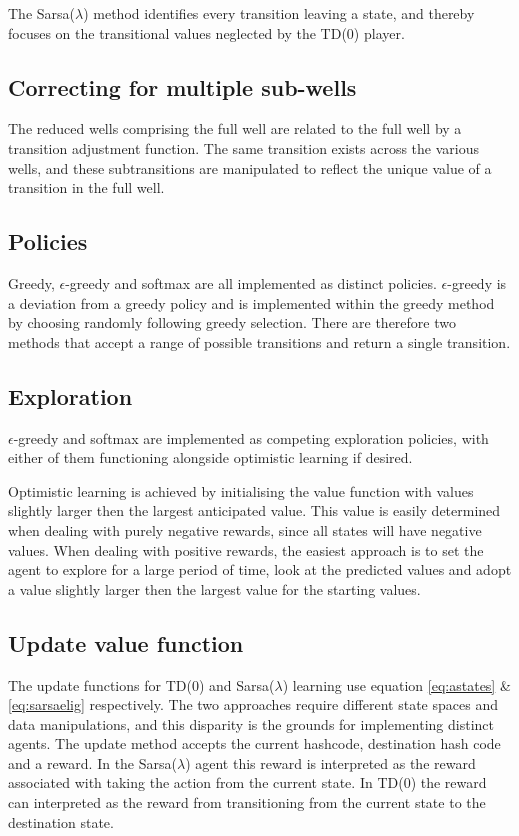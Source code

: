 \documentclass{rucsthesis}
\begin{document}
The Sarsa($\lambda$) method identifies every transition leaving a state, and thereby focuses on the transitional values neglected by the TD(0) player.

\subsection{Correcting for multiple sub-wells}

The reduced wells comprising the full well are related to the full well by a transition adjustment function. The same transition exists across the various wells, and these subtransitions are manipulated to reflect the unique value of a transition in the full well. 

\subsection{Policies}

Greedy, $\epsilon$-greedy and softmax are all implemented as distinct policies. $\epsilon$-greedy is a deviation from a greedy policy and is implemented within the greedy method by choosing randomly following greedy selection. There are therefore two methods that accept a range of possible transitions and return a single transition.

\subsection{Exploration}

$\epsilon$-greedy and softmax are implemented as competing exploration policies, with either of them functioning alongside optimistic learning if desired. 

Optimistic learning is achieved by initialising the value function with values slightly larger then the largest anticipated value. This value is easily determined when dealing with purely negative rewards, since all states will have negative values. When dealing with positive rewards, the easiest approach is to set the agent to explore for a large period of time, look at the predicted values and adopt a value slightly larger then the largest value for the starting values.

\subsection{Update value function}

The update functions for TD(0) and Sarsa($\lambda$) learning use equation \ref{eq:astates} \& \ref{eq:sarsaelig} respectively. The two approaches require different state spaces and data manipulations, and this disparity is the grounds for implementing distinct agents. The update method accepts the current hashcode, destination hash code and a reward. In the Sarsa($\lambda$) agent this reward is interpreted as the reward associated with taking the action from the current state. In TD(0) the reward can interpreted as the reward from transitioning from the current state to the destination state. 
\end{document}
